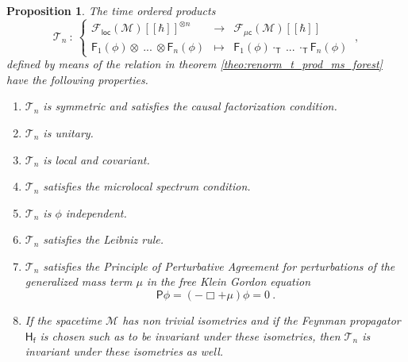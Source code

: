 \documentclass[11pt]{book}
\newcommand{\loc}{\mathsf{loc}}
\newcommand{\muc}{\mu\csf}
\newcommand{\Fcal}{\mathcal{F}}
\newcommand{\Mcal}{\mathcal{M}}
\newcommand{\Tcal}{\mathcal{T}}
\newcommand{\Fsf}{\mathsf{F}}
\newcommand{\Hsf}{\mathsf{H}}
\newcommand{\Psf}{\mathsf{P}}
\newcommand{\Tsf}{\mathsf{T}}
\newcommand{\csf}{\mathsf{c}}
\newcommand{\fsf}{\mathsf{f}}
\theoremstyle{break}
\newtheorem{proposition}{Proposition}[chapter]
\begin{document}
\begin{proposition}\label{prop:properties_scheme} 
The time ordered products
%
\begin{equation*}
\Tcal_n \ : \ 
\left\{
\begin{array}{lcl}
\Fcal_{\loc}(\Mcal)[[\hbar]]^{\otimes n} & \to & \Fcal_{\muc}(\Mcal)[[\hbar]] \\
\Fsf_1(\phi) \otimes \ ... \ \otimes \Fsf_n(\phi) & \mapsto & \Fsf_1(\phi) \cdot_{\Tsf} \ ... \ \cdot_{\Tsf} \Fsf_n(\phi)
\end{array}
\right. \ ,
\end{equation*}
%
defined by means of the relation in theorem \ref{theo:renorm_t_prod_ms_forest} have the following properties.
%
\begin{enumerate}
%
\item\label{item:1_properties_scheme} $\Tcal_n$ is symmetric and satisfies the causal factorization condition.
%
\item\label{item:2_properties_scheme} $\Tcal_n$ is unitary.
%
\item\label{item:3_properties_scheme} $\Tcal_n$ is local and covariant.
%
\item\label{item:4_properties_scheme} $\Tcal_n$ satisfies the microlocal spectrum condition.
%
\item\label{item:5_properties_scheme} $\Tcal_n$ is $\phi$ independent.
%
\item\label{item:6_properties_scheme} $\Tcal_n$ satisfies the Leibniz rule.
%
\item\label{item:7_properties_scheme} $\Tcal_n$ satisfies the Principle of Perturbative Agreement for perturbations of the generalized mass term $\mu$ in the free Klein Gordon equation
%
\begin{equation*}
\Psf \phi = \left( - \Box + \mu \right) \phi = 0 \ . 
\end{equation*}
%
\item\label{item:8_properties_scheme} If the spacetime $\Mcal$ has non trivial isometries and if the Feynman propagator $\Hsf_\fsf$ is chosen such as to be invariant under these isometries, then $\Tcal_n$ is invariant under these isometries as well.
%
\end{enumerate}
%
\end{proposition}
\end{document}
